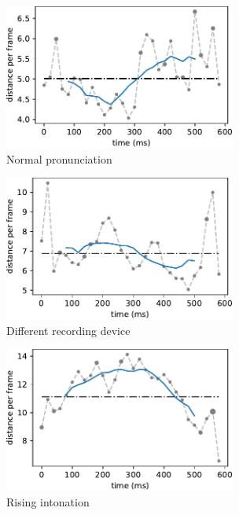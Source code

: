 \documentclass[11pt,a4paper]{article}
\begin{document}
\begin{figure}[ht]
     \centering
      \begin{subfigure}[b]{0.49\textwidth}
         \centering
         \includegraphics[width=3in]{figures/vis-tool/living_ref2living_ref3.pdf}
         \caption{Normal pronunciation}
         \label{fig:vistool-normal}
     \end{subfigure}
     \hfill
     \begin{subfigure}[b]{0.49\textwidth}
         \centering
         \includegraphics[width=3in]{figures/vis-tool/living_ref2living_ph3.pdf}
         \caption{Different recording device}
         \label{fig:fig:vistool-recdev}
     \end{subfigure}
     \par\bigskip
     \begin{subfigure}[b]{0.49\textwidth}
         \centering
         \includegraphics[width=3in]{figures/vis-tool/living_ref2living_sm10.pdf}
         \caption{Rising intonation}
         \label{fig:fig:vistool-rising}
      \end{subfigure}
      \begin{subfigure}[b]{0.49\textwidth}

\end{subfigure}
\end{figure}
\end{document}
